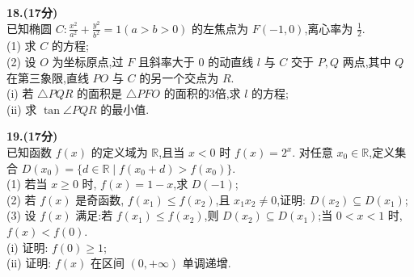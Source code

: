 \documentclass[UTF8, a4paper, 11pt]{ctexart}
\begin{document}
\vspace{1em}
\noindent \textbf{18.(17分)}\\
已知椭圆 $C:\frac{x^{2}}{a^{2}}+\frac{y^{2}}{b^{2}}=1(a>b>0)$ 的左焦点为 $F(-1,0)$,离心率为 $\frac{1}{2}.$\\
(1) 求 $C$ 的方程;\\
(2) 设 $O$ 为坐标原点,过 $F$ 且斜率大于 $0$ 的动直线 $l$ 与 $C$ 交于 $P,Q$ 两点,其中 $Q$ 在第三象限,直线 $PO$ 与 $C$ 的另一个交点为 $R$.\\
(i) 若 $\triangle PQR$ 的面积是 $\triangle PFO$ 的面积的3倍,求 $l$ 的方程;\\
(ii) 求 $\tan\angle PQR$ 的最小值.

\vspace{1em}
\noindent \textbf{19.(17分)}\\
已知函数 $f(x)$ 的定义域为 $\mathbb{R}$,且当 $x<0$ 时 $f(x)=2^{x}$. 对任意 $x_{0}\in\mathbb{R}$,定义集合 $D(x_0)=\{d\in\mathbb{R} \mid f(x_0+d)>f(x_0)\}.$\\
(1) 若当 $x\ge0$ 时, $f(x)=1-x$,求 $D(-1)$;\\
(2) 若 $f(x)$ 是奇函数, $f(x_{1})\le f(x_{2})$,且 $x_{1}x_{2}\ne0$,证明: $D(x_{2})\subseteq D(x_{1})$;\\
(3) 设 $f(x)$ 满足:若 $f(x_{1})\le f(x_{2})$,则 $D(x_{2})\subseteq D(x_{1})$;当 $0<x<1$ 时, $f(x)<f(0)$.\\
(i) 证明: $f(0)\ge1$;\\
(ii) 证明: $f(x)$ 在区间 $(0,+\infty)$ 单调递增.
\end{document}
